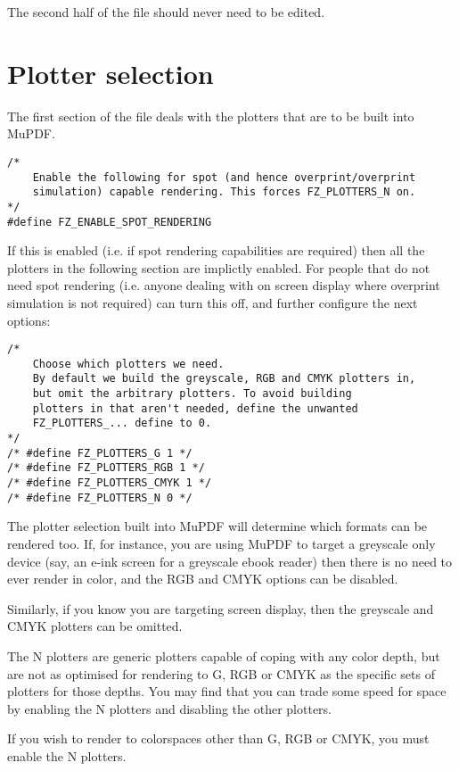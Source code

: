 \documentclass[oneside]{book}
\begin{document}
The second half of the file should never need to be edited.

\section{Plotter selection}

The first section of the file deals with the plotters that are to be built into MuPDF.

\begin{lstlisting}
/*
	Enable the following for spot (and hence overprint/overprint
	simulation) capable rendering. This forces FZ_PLOTTERS_N on.
*/
#define FZ_ENABLE_SPOT_RENDERING
\end{lstlisting}

If this is enabled (i.e. if spot rendering capabilities are required) then all the plotters in the following section are implictly enabled. For people that do not need spot rendering (i.e. anyone dealing with on screen display where overprint simulation is not required) can turn this off, and further configure the next options: 

\begin{lstlisting}
/*
	Choose which plotters we need.
	By default we build the greyscale, RGB and CMYK plotters in,
	but omit the arbitrary plotters. To avoid building
	plotters in that aren't needed, define the unwanted
	FZ_PLOTTERS_... define to 0.
*/
/* #define FZ_PLOTTERS_G 1 */
/* #define FZ_PLOTTERS_RGB 1 */
/* #define FZ_PLOTTERS_CMYK 1 */
/* #define FZ_PLOTTERS_N 0 */
\end{lstlisting}

The plotter selection built into MuPDF will determine which formats can be rendered too. If, for instance, you are using MuPDF to target a greyscale only device (say, an e-ink screen for a greyscale ebook reader) then there is no need to ever render in color, and the RGB and CMYK options can be disabled.

Similarly, if you know you are targeting screen display, then the greyscale and CMYK plotters can be omitted.

The N plotters are generic plotters capable of coping with any color depth, but are not as optimised for rendering to G, RGB or CMYK as the specific sets of plotters for those depths. You may find that you can trade some speed for space by enabling the N plotters and disabling the other plotters.

If you wish to render to colorspaces other than G, RGB or CMYK, you must enable the N plotters.
\end{document}
